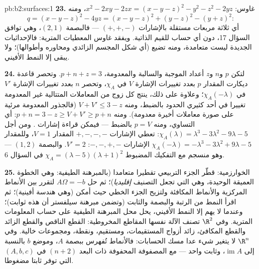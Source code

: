 \begin{solution}{pb:b2:surfaces:1}
\textbf{23.} غاوس: $x^2 - 2xy - 2zx = (x - y - z)^2 - y^2 -
z^2 - 2yz$، ومنه
\[
q = (x - y - z)^2 - 4yz = (x - y - z)^2 + (y - z)^2 - (y +
z)^2 :
\]
أي ثلاثة مربعات مستقلة بالإشارات $(+, +, -)$ --- فالبصمة $(2, 1)$، وهي
توافق السؤال 17، دون أي حساب للقيم الذاتية. ويفقد غاوس المعطيات
المترية: فالإحداثيات الجديدة ليست متعامدة، ومنه تضيع 
(أي شكل المجسم الزائدي ومحاوره وأطوالها)؛ ولا يبقى إلا النمط
الأفيني.

\textbf{24.} لتكن $p$ و$n$ و$z$ أعداد 
الموجبة والسالبة والمعدومة، $p + n + z = 3$. وتحصر قاعدة ديكارت المقدار
$p$ بعدد تغييرات الإشارة $V$ في $\chi_A$، وتحصر $n$ بعدد
تغييرات الإشارة $V'$ في $\chi_A(-\lambda)$؛ وعلاوة على ذلك، ينتج كل زوج من
المعاملات المتتالية غير المعدومة تغييرا في أحد كثيري الحدود بالضبط،
ومنه $V + V' \leq 3 - z$ (فالجذور المعدومة مرئية على صورة معاملات أخيرة معدومة).
ومنه $p + n = 3 - z \geq
V + V' \geq p + n$: أي التساوي، ومنه $p = V$ بالضبط --- فيمكن قراءة إشارات
. ومن أجل $\chi_A(\lambda)
= \lambda^3 - 3\lambda^2 - 9\lambda - 5$: تعطي الإشارات $+,-,-,-$ المقدار $V = 1$،
وللمقدار $\chi_A(-\lambda) = -\lambda^3 - 3\lambda^2
+ 9\lambda - 5$ الإشارات $-,-,+,-$: $V' = 2$. والبصمة $(1,
2)$ --- وهو
منسجم مع التفكيك المضبوط $\chi_A =
(\lambda - 5)(\lambda + 1)^2$ في السؤال 6.

\textbf{25.} الخوارزمية: قطّر الجزء التربيعي تقطيرا متعامدا
(بالمبرهنة الطيفية: وهي الخطوة  العميقة الوحيدة، وهي التي
تجعل التصنيف \emph{إقليديا})؛ ثم حل $A\Omega = -b$ لتقرر بين الأنماط
المركزية والأنماط المكافئة ولتزيح الجزء الخطي حيث أمكن (وهي هندسة
أفينية)؛ ثم اقرأ النمط من الرتبة والبصمة والثابت (وتضمن مبرهنة
سيلفستر أن هذه ثوابت)؛ وعندما لا يهم إلا النمط الأفيني، يحل  محل المبرهنة الطيفية على حساب المعلومات المترية. وفي $\R^2$
تصنف الآلة نفسها المقاطع المخروطية: القطع الناقص والقطع الزائد
والقطع المكافئ، زائد أزواج المستقيمات، ومستقيم، ونقطة، ومجموعات
خالية. وفي $\R^n$ لا يتغير شيء عدا مسك الحسابات: فالأنماط تُفهرس
ببصمة $A$، وموضع $b$ بالنسبة إلى $\operatorname{im}A$، وثابت واحد --- مع
المصفوفة المحفوفة ذات البعد $(n{+}2)$ في $(A, b, c)$ التي توفر ثابتا
مضغوطا.
\end{solution}
